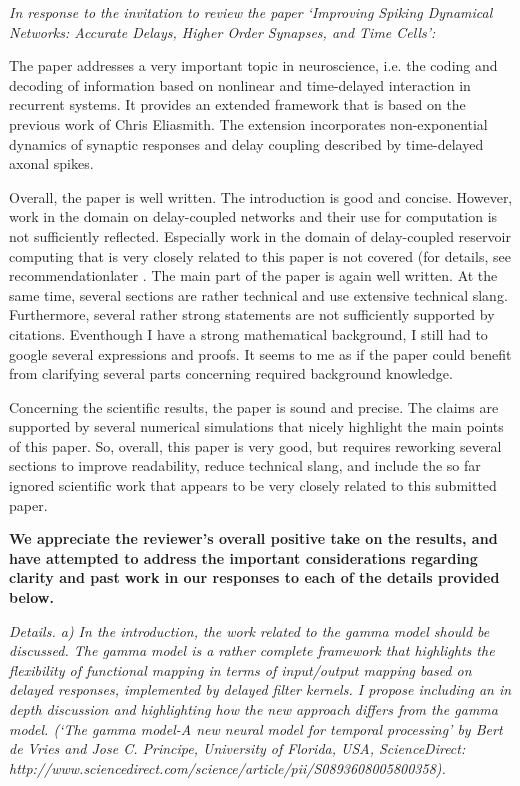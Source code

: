 \documentclass[a4paper]{article}
\newcommand{\newl}{\par\null\par}
\newcommand{\REVIEW}[1]{{\it #1}}
\newcommand{\REPLY}[1]{\newl\begin{adjustwidth}{2em}{2em}{\bf #1}\end{adjustwidth}\newl}
\begin{document}
\REVIEW{In response to the invitation to review the paper `Improving Spiking Dynamical Networks: Accurate Delays, Higher Order Synapses, and Time Cells':
\newl
The paper addresses a very important topic in neuroscience, i.e. the coding and decoding of information based on nonlinear and time-delayed interaction in recurrent systems. It provides an extended framework that is based on the previous work of Chris Eliasmith. The extension incorporates non-exponential dynamics of synaptic responses and delay coupling described by time-delayed axonal spikes.
\newl
Overall, the paper is well written. The introduction is good and concise. However, work in the domain on delay-coupled networks and their use for computation is not sufficiently reflected. Especially work in the domain of delay-coupled reservoir computing that is very closely related to this paper is not covered (for details, see recommendationlater . The main part of the paper is again well written. At the same time, several sections are rather technical and use extensive technical slang. Furthermore, several rather strong statements are not sufficiently supported by citations. Eventhough I have a strong mathematical background, I still had to google several expressions and proofs. It seems to me as if the paper could benefit from clarifying several parts concerning required background knowledge.
\newl
Concerning the scientific results, the paper is sound and precise. The claims are supported by several numerical simulations that nicely highlight the main points of this paper. So, overall, this paper is very good, but requires reworking several sections to improve readability, reduce technical slang, and include the so far ignored scientific work that appears to be very closely related to this submitted paper.}

\REPLY{We appreciate the reviewer's overall positive take on the results, and have attempted to address the important considerations regarding clarity and past work in our responses to each of the details provided below.}

\REVIEW{Details.
a)      In the introduction, the work related to the gamma model should be discussed.  The gamma model is a rather complete framework that highlights the flexibility of functional mapping in terms of input/output mapping based on delayed responses, implemented by delayed filter kernels. I propose including an in depth discussion and highlighting how the new approach differs from the gamma model. (`The gamma model-A new neural model for temporal processing' by Bert de Vries and Jose C. Principe, University of Florida, USA, ScienceDirect: http://www.sciencedirect.com/science/article/pii/S0893608005800358).}
\end{document}
